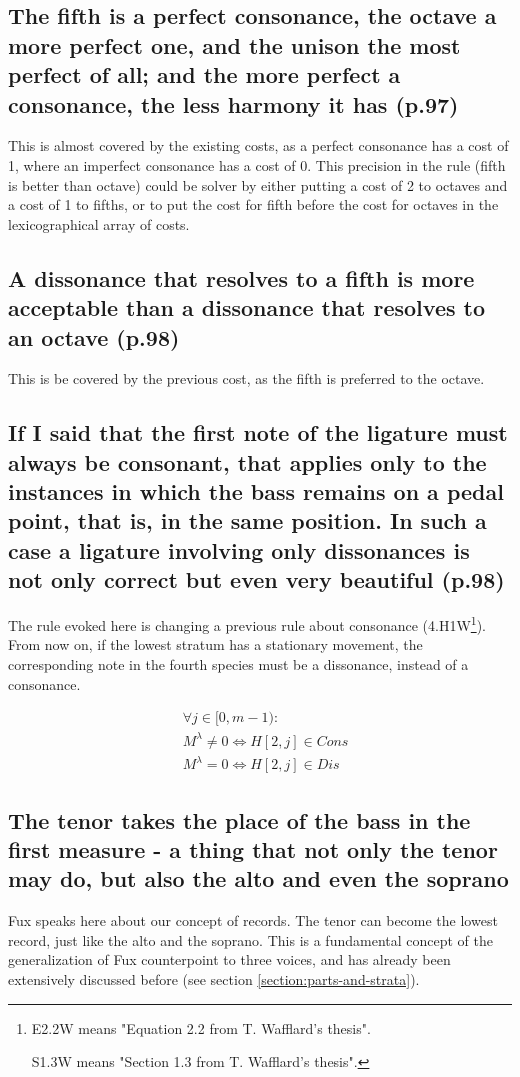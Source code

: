\subsection{The fifth is a perfect consonance, the octave a more perfect one, and the unison the most perfect of all; and the more perfect a consonance, the less harmony it has (p.97)}
This is almost covered by the existing costs, as a perfect consonance has a cost of 1, where an imperfect consonance has a cost of 0. This precision in the rule (fifth is better than octave) could be solver by either putting a cost of 2 to octaves and a cost of 1 to fifths, or to put the cost for fifth before the cost for octaves in the lexicographical array of costs.
\subsection{A dissonance that resolves to a fifth is more acceptable than a dissonance that resolves to an octave (p.98)}
This is be covered by the previous cost, as the fifth is preferred to the octave.

\subsection{If I said that the first note of the ligature must always be consonant, that applies only to the instances in which the bass remains on a pedal point, that is, in the same position. In such a case a ligature involving only dissonances is not only correct but even very beautiful (p.98)}
The rule evoked here is changing a previous rule about consonance (4.H1W\footnote{E2.2W means "Equation 2.2 from T. Wafflard's thesis".

S1.3W means "Section 1.3 from T. Wafflard's thesis".}). From now on, if the lowest stratum has a stationary movement, the corresponding note in the fourth species must be a dissonance, instead of a consonance.

\begin{equation}
\begin{aligned}
&\forall j \in [0, m-1):\\
&M^\lambda \neq 0 \iff H[2, j] \in Cons\\
&M^\lambda = 0 \iff H[2, j] \in Dis
\end{aligned}
    \label{eq:arsiscons} 
\end{equation}

\subsection{The tenor takes the place of the bass in the first measure - a thing that not only the tenor may do, but also the alto and even the soprano}
Fux speaks here about our concept of records. The tenor can become the lowest record, just like the alto and the soprano. This is a fundamental concept of the generalization of Fux counterpoint to three voices, and has already been extensively discussed before (see section \ref{section:parts-and-strata}).

